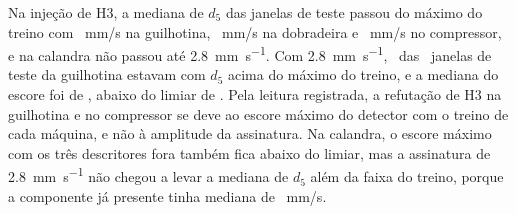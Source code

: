 Na injeção de H3, a mediana de $d_5$ das janelas de teste passou do máximo do treino com \apSeisAsatGuilhotina~mm/s na guilhotina, \apSeisAsatDobradeira~mm/s na dobradeira e \apSeisAsatCompressor~mm/s no compressor, e na calandra não passou até \SI{2,8}{\milli\meter\per\second}. Com \SI{2,8}{\milli\meter\per\second}, \apSeisJanelasDcincoAcimaGuilhotina\ das \apSeisTesteGuilhotina\ janelas de teste da guilhotina estavam com $d_5$ acima do máximo do treino, e a mediana do escore foi de \apSeisEscoreAltoGuilhotina, abaixo do limiar de \apSeisLimiarGuilhotina. Pela leitura registrada, a refutação de H3 na guilhotina e no compressor se deve ao escore máximo do detector com o treino de cada máquina, e não à amplitude da assinatura. Na calandra, o escore máximo com os três descritores fora também fica abaixo do limiar, mas a assinatura de \SI{2,8}{\milli\meter\per\second} não chegou a levar a mediana de $d_5$ além da faixa do treino, porque a componente já presente tinha mediana de \hTresBaseUmXCalandra~mm/s.
